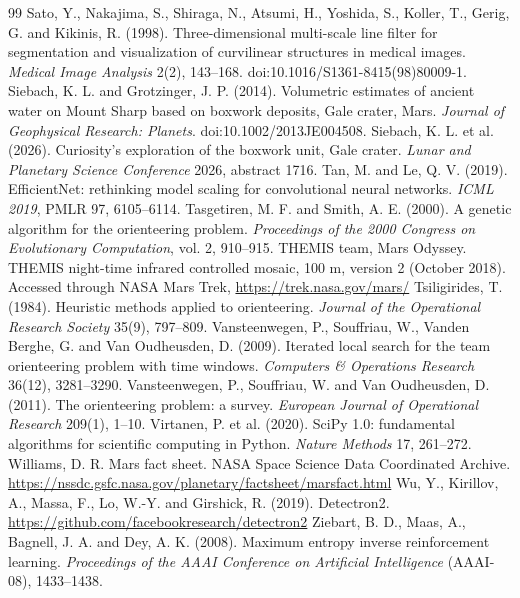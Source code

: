 \documentclass[11pt,a4paper]{article}
\begin{document}
\begin{thebibliography}{99}
 Sato, Y., Nakajima, S., Shiraga, N., Atsumi, H., Yoshida, S., Koller, T., Gerig, G. and Kikinis, R. (1998). Three-dimensional multi-scale line filter for segmentation and visualization of curvilinear structures in medical images. \emph{Medical Image Analysis} 2(2), 143--168. doi:10.1016/S1361-8415(98)80009-1.
 Siebach, K. L. and Grotzinger, J. P. (2014). Volumetric estimates of ancient water on Mount Sharp based on boxwork deposits, Gale crater, Mars. \emph{Journal of Geophysical Research: Planets}. doi:10.1002/2013JE004508.
 Siebach, K. L. et al. (2026). Curiosity's exploration of the boxwork unit, Gale crater. \emph{Lunar and Planetary Science Conference} 2026, abstract 1716.
 Tan, M. and Le, Q. V. (2019). EfficientNet: rethinking model scaling for convolutional neural networks. \emph{ICML 2019}, PMLR 97, 6105--6114.
 Tasgetiren, M. F. and Smith, A. E. (2000). A genetic algorithm for the orienteering problem. \emph{Proceedings of the 2000 Congress on Evolutionary Computation}, vol. 2, 910--915.
 THEMIS team, Mars Odyssey. THEMIS night-time infrared controlled mosaic, 100 m, version 2 (October 2018). Accessed through NASA Mars Trek, \url{https://trek.nasa.gov/mars/}
 Tsiligirides, T. (1984). Heuristic methods applied to orienteering. \emph{Journal of the Operational Research Society} 35(9), 797--809.
 Vansteenwegen, P., Souffriau, W., Vanden Berghe, G. and Van Oudheusden, D. (2009). Iterated local search for the team orienteering problem with time windows. \emph{Computers \& Operations Research} 36(12), 3281--3290.
 Vansteenwegen, P., Souffriau, W. and Van Oudheusden, D. (2011). The orienteering problem: a survey. \emph{European Journal of Operational Research} 209(1), 1--10.
 Virtanen, P. et al. (2020). SciPy 1.0: fundamental algorithms for scientific computing in Python. \emph{Nature Methods} 17, 261--272.
 Williams, D. R. Mars fact sheet. NASA Space Science Data Coordinated Archive. \url{https://nssdc.gsfc.nasa.gov/planetary/factsheet/marsfact.html}
 Wu, Y., Kirillov, A., Massa, F., Lo, W.-Y. and Girshick, R. (2019). Detectron2. \url{https://github.com/facebookresearch/detectron2}
 Ziebart, B. D., Maas, A., Bagnell, J. A. and Dey, A. K. (2008). Maximum entropy inverse reinforcement learning. \emph{Proceedings of the AAAI Conference on Artificial Intelligence} (AAAI-08), 1433--1438.
\end{thebibliography}
\end{document}
